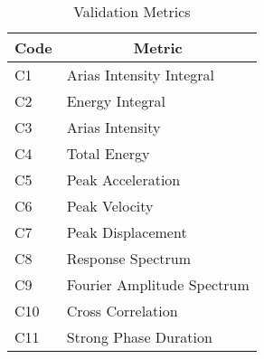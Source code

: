 
\begin{table}[t]
\caption{Validation Metrics}
\centering
\small
\begin{tabular}{ll}
	\hline
	\multicolumn{1}{c}{Code}          & 
	\multicolumn{1}{c}{Metric}        \\
	\hline
	C1   & Arias Intensity Integral   \\
	C2   & Energy Integral            \\
	C3   & Arias Intensity		      \\
	C4   & Total Energy               \\
	C5   & Peak Acceleration          \\
	C6   & Peak Velocity              \\
	C7   & Peak Displacement          \\
	C8   & Response Spectrum          \\
	C9   & Fourier Amplitude Spectrum \\
	C10  & Cross Correlation          \\
	C11  & Strong Phase Duration      \\
	\hline
\end{tabular}
\label{tab:metrics}
\end{table}
